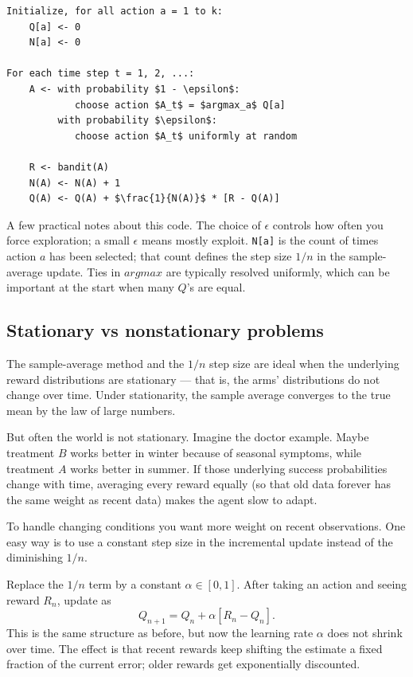 \begin{lstlisting}[mathescape]
Initialize, for all action a = 1 to k:
    Q[a] <- 0
    N[a] <- 0

For each time step t = 1, 2, ...:
    A <- with probability $1 - \epsilon$:
            choose action $A_t$ = $argmax_a$ Q[a]
         with probability $\epsilon$:
            choose action $A_t$ uniformly at random 

    R <- bandit(A)
    N(A) <- N(A) + 1
    Q(A) <- Q(A) + $\frac{1}{N(A)}$ * [R - Q(A)]
\end{lstlisting}
A few practical notes about this code. The choice of $\epsilon$ controls how often you force exploration; a small $\epsilon$ means mostly exploit. \texttt{N[a]} is the count of times action $a$ has been selected; that count defines the step size $1/n$ in the sample-average update. Ties in $argmax$ are typically resolved uniformly, which can be important at the start when many $Q$'s are equal.

\subsection{Stationary vs nonstationary problems}
The sample-average method and the $1/n$ step size are ideal when the underlying reward distributions are stationary — that is, the arms’ distributions do not change over time. Under stationarity, the sample average converges to the true mean by the law of large numbers.

But often the world is not stationary. Imagine the doctor example. Maybe treatment $B$ works better in winter because of seasonal symptoms, while treatment $A$ works better in summer. If those underlying success probabilities change with time, averaging every reward equally (so that old data forever has the same weight as recent data) makes the agent slow to adapt.

To handle changing conditions you want more weight on recent observations. One easy way is to use a constant step size in the incremental update instead of the diminishing $1/n$.

Replace the $1/n$ term by a constant $\alpha\in[0,1]$. After taking an action and seeing reward $R_n$, update as
\begin{equation*}
    Q_{n+1}=Q_n+\alpha [R_n-Q_n].    
\end{equation*}
This is the same structure as before, but now the learning rate $\alpha$ does not shrink over time. The effect is that recent rewards keep shifting the estimate a fixed fraction of the current error; older rewards get exponentially discounted.

